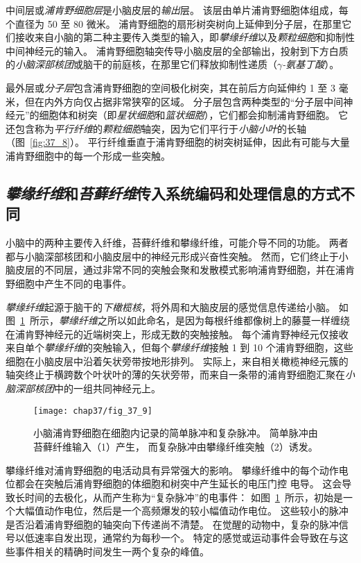 中间层或\textit{浦肯野细胞层}是小脑皮层的\textit{输出}层。
该层由单片浦肯野细胞体组成，每个直径为 50 至 80 微米。
浦肯野细胞的扇形树突树向上延伸到分子层，在那里它们接收来自小脑的第二种主要传入类型的输入，即\textit{攀缘纤维}以及\textit{颗粒细胞}和抑制性中间神经元的输入。
浦肯野细胞轴突传导小脑皮层的全部输出，投射到下方白质的\textit{小脑深部核团}或脑干的前庭核，在那里它们释放抑制性递质（\textit{$\gamma$-氨基丁酸}）。


最外层或\textit{分子层}包含浦肯野细胞的空间极化树突，其在前后方向延伸约 1 至 3 毫米，但在内外方向仅占据非常狭窄的区域。
分子层包含两种类型的“分子层中间神经元”的细胞体和树突（即\textit{星状细胞}和\textit{篮状细胞}），它们都会抑制浦肯野细胞。
它还包含称为\textit{平行纤维}的\textit{颗粒细胞}轴突，因为它们平行于\textit{小脑小叶}的长轴（图~\ref{fig:37_8}）。
平行纤维垂直于浦肯野细胞的树突树延伸，因此有可能与大量浦肯野细胞中的每一个形成一些突触。


\subsection{\textit{攀缘纤维}和\textit{苔藓纤维}传入系统编码和处理信息的方式不同}

小脑中的两种主要传入纤维，苔藓纤维和攀缘纤维，可能介导不同的功能。
两者都与小脑深部核团和小脑皮层中的神经元形成兴奋性突触。
然而，它们终止于小脑皮层的不同层，通过非常不同的突触会聚和发散模式影响浦肯野细胞，并在浦肯野细胞中产生不同的电事件。


\textit{攀缘纤维}起源于脑干的\textit{下橄榄核}，将外周和大脑皮层的感觉信息传递给小脑。
如图~\ref{fig:37_9}~所示，\textit{攀缘纤维}之所以如此命名，是因为每根纤维都像树上的藤蔓一样缠绕在浦肯野神经元的近端树突上，形成无数的突触接触。
每个浦肯野神经元仅接收来自单个\textit{攀缘纤维}的突触输入，但每个\textit{攀缘纤维}接触 1 到 10 个浦肯野细胞，这些细胞在小脑皮层中沿着矢状旁带按地形排列。
实际上，来自相关橄榄神经元簇的轴突终止于横跨数个叶状叶的薄的矢状旁带，而来自一条带的浦肯野细胞汇聚在\textit{小脑深部核团}中的一组共同神经元上。


\begin{figure}[htbp]
	\centering
	\texttt{[image: chap37/fig\_37\_9]}
	\caption{小脑浦肯野细胞在细胞内记录的简单脉冲和复杂脉冲。
		简单脉冲由苔藓纤维输入（1）产生，
		而复杂脉冲由攀缘纤维突触（2）诱发\cite{martinez1971electrogenesis}。}
	\label{fig:37_9}
\end{figure}


攀缘纤维对浦肯野细胞的电活动具有异常强大的影响。
攀缘纤维中的每个动作电位都会在突触后浦肯野细胞的体细胞和树突中产生延长的电压门控  电导。
这会导致长时间的去极化，从而产生称为“复杂脉冲”的电事件：
如图~\ref{fig:37_9}~所示，初始是一个大幅值动作电位，然后是一个高频爆发的较小幅值动作电位。
这些较小的脉冲是否沿着浦肯野细胞的轴突向下传递尚不清楚。
在觉醒的动物中，复杂的脉冲信号以低速率自发出现，通常约为每秒一个。
特定的感觉或运动事件会导致在与这些事件相关的精确时间发生一两个复杂的峰值。


